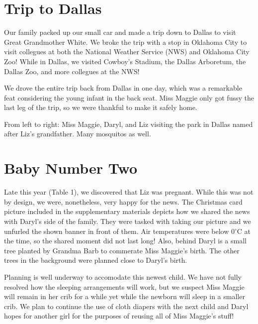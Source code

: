 \documentclass{article}
\makeatletter
\def\degC{$^{\circ}$C }
\newenvironment{figurehere}
  {\def\@captype{figure}}
  {}
\makeatother
\begin{document}
\begin{multicols}{2}
\section{Trip to Dallas}

Our family packed up our small car and made a trip down to Dallas to visit 
Great Grandmother White.  We broke the trip with a stop in Oklahoma City to
visit collegues at both the National Weather Service (NWS) and Oklahoma City Zoo!
While in Dallas, we visited Cowboy's Stadium, the Dallas Arboretum, the 
Dallas Zoo, and more collegues at the NWS!

We drove the entire trip back from Dallas in one day, which was a remarkable
feat considering the young infant in the back seat. Miss Maggie only got fussy
the last leg of the trip, so we were thankful to make it safely home.

\bigskip

\begin{figurehere}
 \centering   
 \caption{From left to right: Miss Maggie, Daryl, and Liz visiting the park
in Dallas named after Liz's grandfather. Many mosquitos as well.}
\end{figurehere}

\section{Baby Number Two}

Late this year (Table 1), we discovered that Liz was pregnant.
While this was not by design, we were, nonetheless, very happy for the news.
The Christmas card picture included in the supplementary materials depicts
how we shared the news with Daryl's side of the family.  They were tasked
with taking our picture and we unfurled the shown banner in front of them.
Air temperatures were below 0\degC at the time, so the shared moment did 
not last long!  Also, behind Daryl is a small tree planted by Grandma
Barb to commerate Miss Maggie's birth. The other trees in the background 
were planned close to Daryl's birth.

Planning is well underway to accomodate this newest child.  We have not
fully resolved how the sleeping arrangements will work, but we suspect 
Miss Maggie will remain in her crib for a while yet while the newborn 
will sleep in a smaller crib.  We plan to continue the use of cloth 
diapers with the next child and Daryl hopes for another girl for the purposes
of reusing all of Miss Maggie's stuff!  


\end{multicols}
\end{document}
